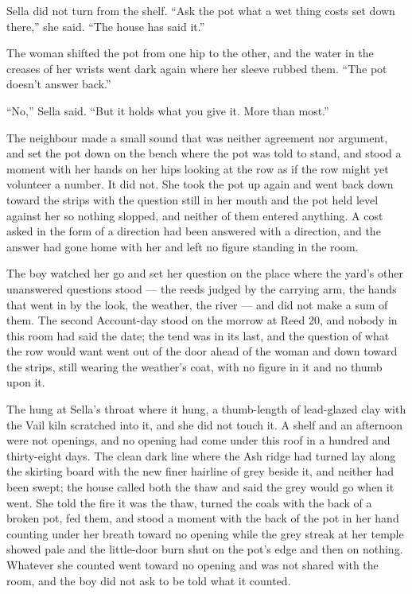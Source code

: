 Sella did not turn from the shelf. “Ask the pot what a wet thing costs set down there,” she said. “The house has said it.”

The woman shifted the pot from one hip to the other, and the water in the creases of her wrists went dark again where her sleeve rubbed them. “The pot doesn't answer back.”

“No,” Sella said. “But it holds what you give it. More than most.”

The neighbour made a small sound that was neither agreement nor argument, and set the pot down on the bench where the pot was told to stand, and stood a moment with her hands on her hips looking at the row as if the row might yet volunteer a number. It did not. She took the pot up again and went back down toward the strips with the question still in her mouth and the pot held level against her so nothing slopped, and neither of them entered anything. A cost asked in the form of a direction had been answered with a direction, and the answer had gone home with her and left no figure standing in the room.

The boy watched her go and set her question on the place where the yard's other unanswered questions stood --- the reeds judged by the carrying arm, the hands that went in by the look, the weather, the river --- and did not make a sum of them. The second Account-day stood on the morrow at Reed 20, and nobody in this room had said the date; the tend was in its last, and the question of what the row would want went out of the door ahead of the woman and down toward the strips, still wearing the weather's coat, with no figure in it and no thumb upon it.

The  hung at Sella's throat where it hung, a thumb-length of lead-glazed clay with the Vail kiln scratched into it, and she did not touch it. A shelf and an afternoon were not openings, and no opening had come under this roof in a hundred and thirty-eight days. The clean dark line where the Ash ridge had turned lay along the skirting board with the new finer hairline of grey beside it, and neither had been swept; the house called both the thaw and said the grey would go when it went. She told the fire it was the thaw, turned the coals with the back of a broken pot, fed them, and stood a moment with the back of the pot in her hand counting under her breath toward no opening while the grey streak at her temple showed pale and the little-door burn shut on the pot's edge and then on nothing. Whatever she counted went toward no opening and was not shared with the room, and the boy did not ask to be told what it counted.

